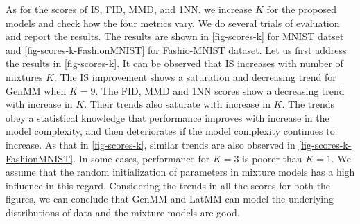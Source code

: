 As for the scores of IS, FID, MMD, and 1NN, we increase $K$ for the proposed models and check
how the four metrics vary. We do several trials of evaluation and
report the results. The results are shown in
\autoref{fig-scores-k} for MNIST datset and
\autoref{fig-scores-k-FashionMNIST} for Fashio-MNIST dataset. Let us
first address the results in \autoref{fig-scores-k}. It can be
observed that IS increases with number of mixtures $K$. The IS
improvement shows a saturation and decreasing trend for GenMM when
$K=9$. The FID, MMD and 1NN scores show a decreasing trend with
increase in $K$. Their trends also saturate with increase in $K$. The
trends obey a statistical knowledge that performance improves with
increase in the model complexity, and then deteriorates if the model
complexity continues to increase. As that in \autoref{fig-scores-k}, similar trends are also observed in \autoref{fig-scores-k-FashionMNIST}. In some cases, performance for $K=3$ is poorer than $K=1$. We assume that the random initialization of parameters in mixture models has a high influence in this regard. 
Considering the trends in all the scores for both the figures, we can conclude that GenMM and LatMM can model the underlying distributions of data and the mixture models are good.


